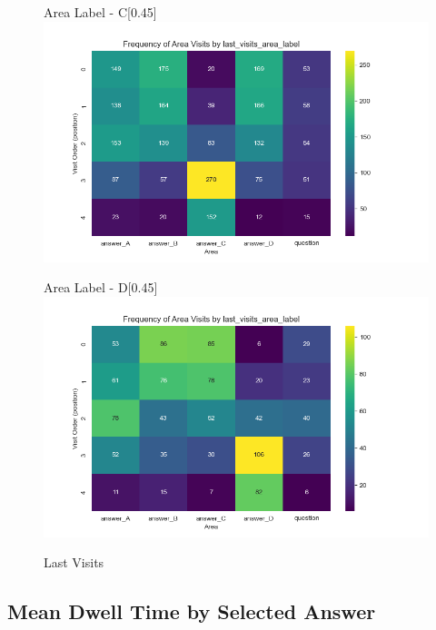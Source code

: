\documentclass[manuscript,review,anonymous]{acmart}
\begin{document}
\begin{figure}[htbp]
          \begin{subcaptionbox}{Area Label - C\label{fig:c4}}[0.45\textwidth]
            {\centering\includegraphics[width=\linewidth]{plots/visits/matrix__last_visits_area_label_hunters_C.png}}
          \end{subcaptionbox}
          \hfill
          \begin{subcaptionbox}{Area Label - D\label{fig:d4}}[0.45\textwidth]
            {\centering\includegraphics[width=\linewidth]{plots/visits/matrix__last_visits_area_label_hunters_D.png}}
          \end{subcaptionbox}
          
          \caption{Last Visits}
          \label{fig:last_hunt_lbl}
        \end{figure}
    
    
    \subsection{Mean Dwell Time by Selected Answer}
\end{document}
